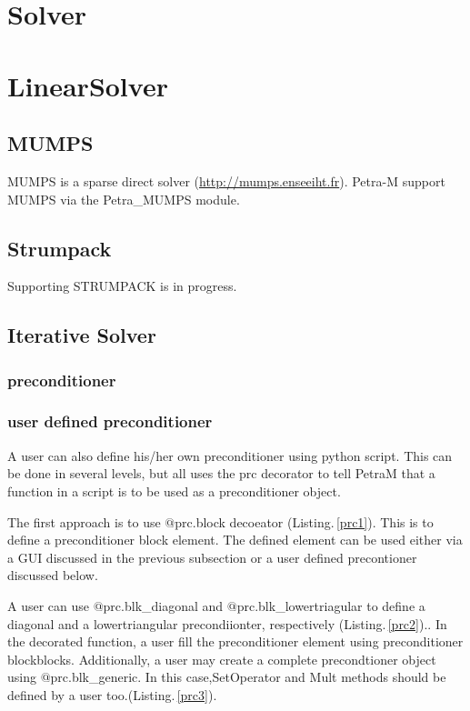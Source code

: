 \documentclass[11pt,a4paper,final]{report}
\begin{document}
\section{Solver}

\section{LinearSolver}
\subsection{MUMPS}
MUMPS is a sparse direct solver (\url{http://mumps.enseeiht.fr}). Petra-M support MUMPS via the Petra\_MUMPS module. 

\subsection{Strumpack}
Supporting STRUMPACK is in progress.

\subsection{Iterative Solver}
\subsubsection{preconditioner}


\subsubsection{user defined preconditioner}
A user can also define his/her own preconditioner using python script.  This can be done in several levels, but all
uses the prc decorator to tell PetraM that a function in a script is to be used as a preconditioner object.

The first approach is to use $@$prc.block decoeator (Listing.\,\ref{prc1}). This is to define a preconditioner block element.  The defined element can be used either via a GUI discussed in the previous subsection or a user defined precontioner discussed below.  


A user can use $@$prc.blk\_diagonal and $@$prc.blk\_lowertriagular to define a diagonal and a lowertriangular precondiionter, respectively (Listing.\,\ref{prc2}).. In the decorated function, a user fill the preconditioner element using preconditioner blockblocks. Additionally, a user may create a complete precondtioner object using $@$prc.blk\_generic. In this case,SetOperator and Mult methods should be defined  by a user too.(Listing.\,\ref{prc3}). 
\end{document}
